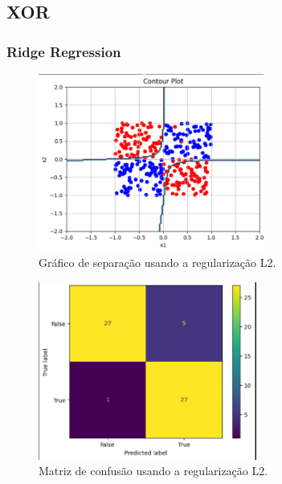 \documentclass{article}
\begin{document}
\vspace{15pt}

\subsection*{XOR}

\vspace{15pt}

\subsubsection*{Ridge Regression}

\vspace{15pt}

\begin{figure}[h]

    \centering
    \includegraphics[height=2.3in]{Separation_L2.png}
    \caption{Gráfico de separação usando a regularização L2.}
    \label{fig:example}
    
\end{figure}

\vspace{15pt}

\begin{figure}[h]

    \centering
    \includegraphics[height=2.3in]{Matrix_conf_XOR_L2.png}
    \caption{Matriz de confusão usando a regularização L2.}
    \label{fig:example}
    
\end{figure}
\end{document}

